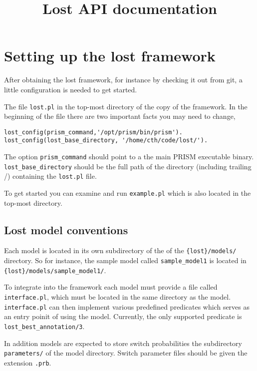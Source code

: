 \documentclass{article}
\title{Lost API documentation}
\begin{document}
\maketitle

\section{Setting up the lost framework}

After obtaining the lost framework, for instance by checking it out
from git, a little configuration is needed to get started.

The file \texttt{lost.pl} in the top-most directory of the copy
of the framework. In the beginning of the file there are two 
important facts you may need to change,
\begin{verbatim}
lost_config(prism_command,'/opt/prism/bin/prism').
lost_config(lost_base_directory, '/home/cth/code/lost/').
\end{verbatim}

The option \texttt{prism\_command} should point to a the main PRISM executable
binary. \\
\texttt{lost\_base\_directory} should be the full path of the
directory (including trailing /) containing the \texttt{lost.pl}
file. 

To get started you can examine and run \texttt{example.pl} which 
is also located in the top-most directory.

\subsection{Lost model conventions}
\label{sec:lost_model_conventions}

Each model is located in its own subdirectory of the of the
\texttt{\{lost\}/models/} directory. So for instance, the sample model
called \texttt{sample\_model1} is located in
\texttt{\{lost\}/models/sample\_model1/}.

To integrate into the framework each model must provide a file called
\texttt{interface.pl}, which must be located in the same directory as
the model. \texttt{interface.pl} can then implement various predefined
predicates which serves as an entry poinit of using the
model. Currently, the only supported predicate is
\texttt{lost\_best\_annotation/3}.

In addition models are expected to store switch probabilities the
subdirectory \texttt{parameters/} of the model directory. Switch
parameter files should be given the extension \texttt{.prb}.
\end{document}
